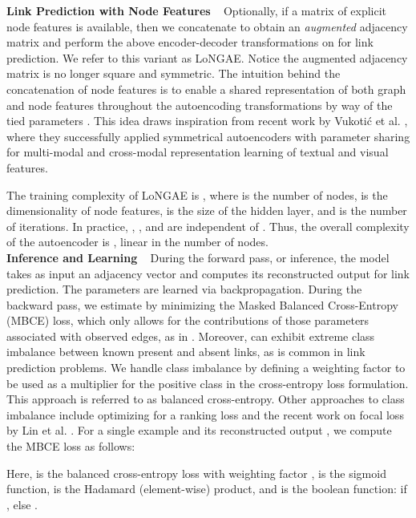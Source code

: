 \documentclass[letterpaper, conference]{IEEEtran}
\begin{document}
\noindent \textbf{Link Prediction with Node Features} ~ Optionally, if a matrix of explicit node features  is available, then we concatenate  to obtain an \emph{augmented} adjacency matrix  and perform the above encoder-decoder transformations on  for link prediction. We refer to this variant as LoNGAE. Notice the augmented adjacency matrix is no longer square and symmetric. The intuition behind the concatenation of node features is to enable a shared representation of both graph and node features throughout the autoencoding transformations by way of the tied parameters . This idea draws inspiration from recent work by Vukoti{\'c} et al. \cite{Vukotic:2016}, where they successfully applied symmetrical autoencoders with parameter sharing for multi-modal and cross-modal representation learning of textual and visual features.

The training complexity of LoNGAE is , where  is the number of nodes,  is the dimensionality of node features,  is the size of the hidden layer, and  is the number of iterations. In practice, , , and  are independent of . Thus, the overall complexity of the autoencoder is , linear in the number of nodes.\\

\noindent \textbf{Inference and Learning} ~ During the forward pass, or inference, the model takes as input an adjacency vector  and computes its reconstructed output  for link prediction. The parameters  are learned via backpropagation. During the backward pass, we estimate  by minimizing the Masked Balanced Cross-Entropy (MBCE) loss, which only allows for the contributions of those parameters associated with observed edges, as in \cite{Sedhain:2015}. Moreover,  can exhibit extreme class imbalance between known present and absent links, as is common in link prediction problems. We handle class imbalance by defining a weighting factor  to be used as a multiplier for the positive class in the cross-entropy loss formulation. This approach is referred to as balanced cross-entropy. Other approaches to class imbalance include optimizing for a ranking loss \cite{Menon:2011} and the recent work on focal loss by Lin et al. \cite{Lin:2017}. For a single example  and its reconstructed output , we compute the MBCE loss as follows:

Here,  is the balanced cross-entropy loss with weighting factor ,  is the sigmoid function,  is the Hadamard (element-wise) product,  and  is the boolean function:   if , else .
\end{document}
